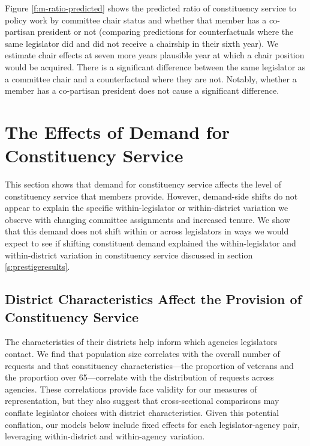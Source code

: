 \documentclass[12pt]{article}
\begin{document}
Figure \ref{f:m-ratio-predicted} shows the predicted ratio of constituency service to policy work by committee chair status and whether that member has a co-partisan president or not (comparing predictions for counterfactuals where the same legislator did and did not receive a chairship in their sixth year). We estimate chair effects at seven more years plausible year at which a chair position would be acquired. %
There is a significant difference between the same legislator as a committee chair and a counterfactual where they are not. Notably, whether a member has a co-partisan president does not cause a significant difference. 



\section{The Effects of Demand for Constituency Service}\label{s:demand} 

This section shows that demand for constituency service affects the level of constituency service that members provide. However, demand-side shifts do not appear to explain the specific within-legislator or within-district variation we observe with changing committee assignments and increased tenure. %
We show that this demand does not shift within or across legislators in ways we would expect to see if shifting constituent demand explained the within-legislator and within-district variation in constituency service discussed in section \ref{s:prestigeresults}.

\subsection{District Characteristics Affect the Provision of Constituency Service}

The characteristics of their districts help inform which agencies legislators contact. We find that population size correlates with the overall number of requests and that constituency characteristics—the proportion of veterans and the proportion over 65—correlate with the distribution of requests across agencies. These correlations provide face validity for our measures of representation, but they also suggest that cross-sectional comparisons may conflate legislator choices with district characteristics. Given this potential conflation, our models below include fixed effects for each legislator-agency pair, leveraging within-district and within-agency variation.  
\end{document}
